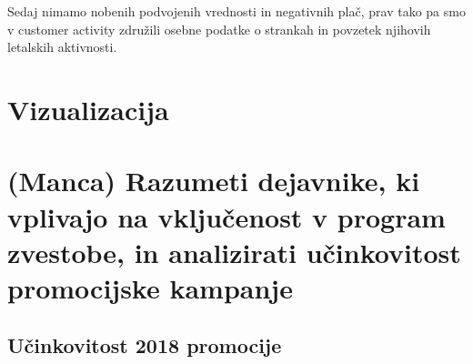 \documentclass[
]{article}
\begin{document}
Sedaj nimamo nobenih podvojenih vrednosti in negativnih plač, prav tako
pa smo v customer activity združili osebne podatke o strankah in
povzetek njihovih letalskih aktivnosti.

\section{Vizualizacija}\label{vizualizacija}

\section{(Manca) Razumeti dejavnike, ki vplivajo na vključenost v
program zvestobe, in analizirati učinkovitost promocijske
kampanje}\label{manca-razumeti-dejavnike-ki-vplivajo-na-vkljuux10denost-v-program-zvestobe-in-analizirati-uux10dinkovitost-promocijske-kampanje}

\subsection{Učinkovitost 2018
promocije}\label{uux10dinkovitost-2018-promocije}
\end{document}
